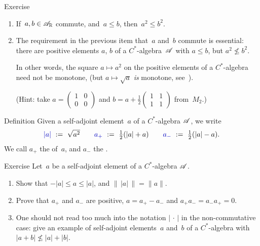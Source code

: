 \documentclass[a]{subfiles}
\begin{document}
\begin{parsec}
\begin{point}[sqrt]{Exercise}
\begin{enumerate}
\item
If~$a,b\in\mathscr{A}_{\mathbb{R}}$ commute, and~$a\leq b$, then~$a^2\leq b^2$.

\item
The requirement in the previous item  that~$a$ and~$b$ commute is essential:
there are positive elements $a$, $b$ of a $C^*$-algebra~$\mathscr{A}$
with $a\leq b$, but $a^2 \nleq b^2$.

In other words, the square $a\mapsto a^2$
on the positive elements of a $C^*$-algebra
need not be monotone,
(but $a\mapsto \sqrt{a}$ \emph{is} monotone, see~).

(Hint: take $a=(\begin{smallmatrix}1&0\\0&0\end{smallmatrix})$
and $b=a+\frac{1}{2}(\begin{smallmatrix}1&1\\1&1\end{smallmatrix})$
from~$M_2$.)
\end{enumerate}
\end{point}
\begin{point}{Definition}
Given a self-adjoint element~$a$ of a $C^*$-algebra $\mathscr{A}$,
we write
\begin{equation*}
\textstyle
\Define{\left|a\right|}\ :=\ \sqrt{a^2}
\qquad
\Define{\pos{a}}\ :=\ \frac{1}{2}(\left|a\right| + a)
\qquad
\Define{a_{-}}\ :=\ \frac{1}{2}(\left|a\right| - a).
\end{equation*}
We call $a_+$ the  of~$a$,
and $a_-$ the .
\end{point}
\begin{point}{Exercise}%
Let~$a$ be a self-adjoint element of a
 $C^*$-algebra $\mathscr{A}$.
\begin{enumerate}
\item
Show that $-\left|a\right| \leq a \leq \left| a \right|$,
and $\|\,\left|a\right|\,\|= \|a\|$.
\item
Prove that $a_+$ and $a_-$ are positive,  $a=a_+-a_-$
and $a_+a_-=a_-a_+=0$.
\item
One should not read too much into the notation
$\left|\,\cdot\,\right|$
in the non-commutative case:
give an example of
self-adjoint elements~$a$ and~$b$ of a $C^*$-algebra with
 $\left|a+b\right|\nleq \left|a\right|+ \left|b\right|$.


\end{enumerate}
\end{point}
\end{parsec}
\end{document}
